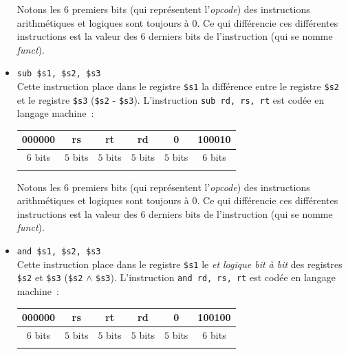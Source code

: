 \documentclass[12pt]{article}
\begin{document}
\begin{itemize}
Notons les $6$ premiers bits (qui représentent l'\emph{opcode}) des instructions arithmétiques et logiques sont toujours à $0$. Ce qui différencie ces
différentes instructions est la valeur des $6$ derniers bits de l'instruction (qui se nomme \emph{funct}).\\

\item \verb+sub $s1, $s2, $s3+\\
Cette instruction place dans le registre \verb+$s1+ la différence entre le registre \verb+$s2+ et le registre \verb+$s3+ (\verb+$s2+ - \verb+$s3+).
L'instruction \verb+sub rd, rs, rt+ est codée en langage machine~:\\
\begin{center}
\begin{tabular}{cccccc}
\hline
\multicolumn{1}{|c}{000000} & \multicolumn{1}{|c}{rs} & \multicolumn{1}{|c}{rt} & \multicolumn{1}{|c|}{rd} & \multicolumn{1}{|c|}{0} & \multicolumn{1}{|c|}{100010}\\
\hline
$6$ bits & $5$ bits & $5$ bits & $5$ bits & $5$ bits & $6$ bits\\
&&&&&\\
\end{tabular}
\end{center}

Notons les $6$ premiers bits (qui représentent l'\emph{opcode}) des instructions arithmétiques et logiques sont toujours à $0$. Ce qui différencie ces
différentes instructions est la valeur des $6$ derniers bits de l'instruction (qui se nomme \emph{funct}).\\

\item \verb+and $s1, $s2, $s3+\\
Cette instruction place dans le registre \verb+$s1+ le \emph{et logique bit à bit}
des registres \verb+$s2+ et \verb+$s3+ (\verb+$s2+ $\wedge$ \verb+$s3+).
L'instruction \verb+and rd, rs, rt+ est codée en langage machine~:\\
\begin{center}
\begin{tabular}{cccccc}
\hline
\multicolumn{1}{|c}{000000} & \multicolumn{1}{|c}{rs} & \multicolumn{1}{|c}{rt} & \multicolumn{1}{|c|}{rd} & \multicolumn{1}{|c|}{0} & \multicolumn{1}{|c|}{100100}\\
\hline
$6$ bits & $5$ bits & $5$ bits & $5$ bits & $5$ bits & $6$ bits\\
&&&&&\\
\end{tabular}
\end{center}


\end{itemize}
\end{document}

